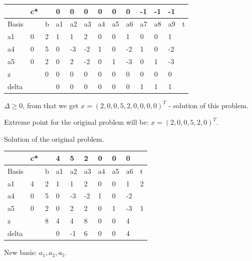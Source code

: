 \begin{table}[H]
\begin{tabular}{|l|l|l|l|l|l|l|l|l|l|l|l|l|}
\hline
      & c* &   & 0  & 0  & 0  & 0  & 0  & 0  & -1 & -1 & -1 &   \\ \hline
Basis &    & b & a1 & a2 & a3 & a4 & a5 & a6 & a7 & a8 & a9 & t \\ \hline
a1    & 0  & 2 & 1  & 1  & 2  & 0  & 0  & 1  & 0  & 0  & 1  &   \\ \hline
a4    & 0  & 5 & 0  & -3 & -2 & 1  & 0  & -2 & 1  & 0  & -2 &   \\ \hline
a5    & 0  & 2 & 0  & 2  & -2 & 0  & 1  & -3 & 0  & 1  & -3 &   \\ \hline
z     &    & 0 & 0  & 0  & 0  & 0  & 0  & 0  & 0  & 0  & 0  &   \\ \hline
delta &    &   & 0  & 0  & 0  & 0  & 0  & 0  & 1  & 1  & 1  &   \\ \hline
\end{tabular}
\end{table}
$\Delta \geq 0$, from that we get $x = (2, 0, 0, 5, 2, 0, 0, 0, 0)^T$ - solution of this problem.

Extreme point for the original problem will be: $x = (2, 0, 0, 5, 2, 0)^T$.

Solution of the original problem.

\begin{table}[H]
\begin{tabular}{|l|l|l|l|l|l|l|l|l|l|}
\hline
      & c* &   & 4  & 5  & 2  & 0  & 0  & 0  &   \\ \hline
Basis &    & b & a1 & a2 & a3 & a4 & a5 & a6 & t \\ \hline
a1    & 4  & 2 & 1  & 1  & 2  & 0  & 0  & 1  & 2 \\ \hline
a4    & 0  & 5 & 0  & -3 & -2 & 1  & 0  & -2 &   \\ \hline
a5    & 0  & 2 & 0  & 2  & 2  & 0  & 1  & -3 & 1 \\ \hline
z     &    & 8 & 4  & 4  & 8  & 0  & 0  & 4  &   \\ \hline
delta &    &   & 0  & -1 & 6  & 0  & 0  & 4  &   \\ \hline
\end{tabular}
\end{table}

New basis: $a_1, a_2, a_5$.

